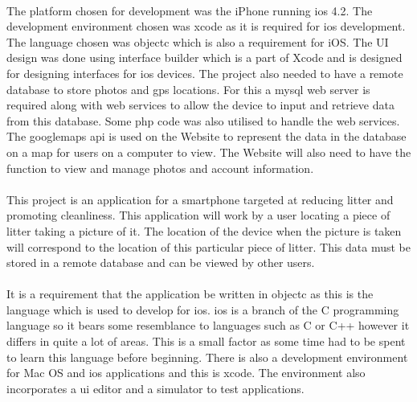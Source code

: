 \documentclass[12pt]{article}
\begin{document}
\paragraph{}


The platform chosen for development was the iPhone running \gls{ios} 4.2. The development environment chosen was \gls{xcode} as it is required for \gls{ios} development. The language chosen was \gls{objectc} which is also a requirement for iOS. The UI design was done using interface builder which is a part of Xcode and is designed for designing interfaces for \gls{ios} devices. The project also needed to have a remote database to store photos and \gls{gps} locations. For this a \gls{mysql} web server is required along with web services to allow the device to input and retrieve data from this database. Some \gls{php} code was also utilised to handle the web services. The \gls{googlemaps} \gls{api} is used on the Website to represent the data in the database on a map for users on a computer to view. The Website will also need to have the function to view and manage photos and account information.

\paragraph{}

This project is an application for a \gls{smartphone} targeted at reducing litter and promoting cleanliness. This application will work by a user locating a piece of litter taking a picture of it. The location of the device when the picture is taken will correspond to the location of this particular piece of litter. This data must be stored in a remote database and can be viewed by other users.

\paragraph{}

It is a requirement that the application be written in \gls{objectc} as this is the language which is used to develop for \gls{ios}. \gls{ios} is a branch of the C programming language so it bears some resemblance to languages such as C or C++ however it differs in quite a lot of areas. This is a small factor as some time had to be spent to learn this language before beginning. There is also a development environment for Mac OS and \gls{ios} applications and this is \gls{xcode}. The environment also incorporates a \gls{ui} editor and a simulator to test applications.
\end{document}
